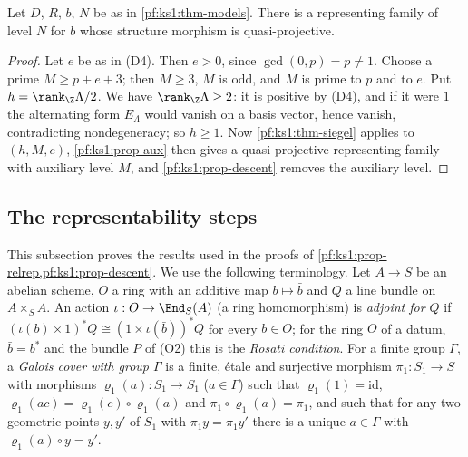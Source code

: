 \begin{proposition}\label{pf:ks1:prop-repfam}
Let $D$, $R$, $b$, $N$ be as in \cref{pf:ks1:thm-models}. There is a representing family of level $N$ for
$b$ whose structure morphism is quasi-projective.
\end{proposition}

\begin{proof}
Let $e$ be as in (D4). Then $e>0$, since $\gcd(0,p)=p\neq1$. Choose a prime $M\ge p+e+3$; then $M\ge3$, $M$ is
odd, and $M$ is prime to $p$ and to $e$. Put $h=\rank_\Z\Lambda/2$. We have $\rank_\Z\Lambda\ge2$: it is positive
by (D4), and if it were $1$ the alternating form $E_\Lambda$ would vanish on a basis vector, hence vanish, contradicting
nondegeneracy; so $h\ge1$. Now
\cref{pf:ks1:thm-siegel} applies to $(h,M,e)$, \cref{pf:ks1:prop-aux} then gives a quasi-projective
representing family with auxiliary level $M$, and \cref{pf:ks1:prop-descent} removes the auxiliary level.
\end{proof}


\subsection{The representability steps}\label{pf:ks1:sec-repsteps}

This subsection proves the results used in the proofs of \cref{pf:ks1:prop-relrep,pf:ks1:prop-descent}. We use the following
terminology. Let $A\to S$ be an abelian scheme, $O$ a ring with an additive map $b\mapsto\bar b$ and $Q$ a line bundle on $A\times_SA$. An
action $\iota:O\to\End_S(A)$ (a ring homomorphism) is \emph{adjoint for $Q$} if $(\iota(b)\times1)^*Q\cong(1\times\iota(\bar b))^*Q$ for every
$b\in O$; for the ring $O$ of a datum, $\bar b=b^*$ and the bundle $P$ of (O2) this is the \emph{Rosati condition}. For a finite group $\Gamma$, a
\emph{Galois cover with group $\Gamma$} is a finite, \'etale and surjective morphism $\pi_1:S_1\to S$ with morphisms $\varrho_1(a):S_1\to S_1$
($a\in\Gamma$) such that $\varrho_1(1)=\mathrm{id}$, $\varrho_1(ac)=\varrho_1(c)\circ\varrho_1(a)$ and $\pi_1\circ\varrho_1(a)=\pi_1$, and such that
for any two geometric points $y,y'$ of $S_1$ with $\pi_1y=\pi_1y'$ there is a unique $a\in\Gamma$ with $\varrho_1(a)\circ y=y'$.

